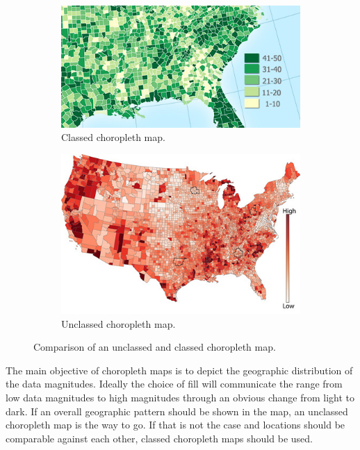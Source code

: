 \begin{figure}[!htb]
  \captionsetup[subfigure]{justification=centering}
  \centering
  \begin{subfigure}[b]{0.4\textwidth}
    \includegraphics[width=\textwidth]{images/choropleth/classed.jpg}
    \caption{Classed choropleth map.}
  \end{subfigure}
  \hfill
  \begin{subfigure}[b]{0.4\textwidth}
    \includegraphics[width=\textwidth]{images/choropleth/unclassed.jpg}
    \caption{Unclassed choropleth map.}
  \end{subfigure}
  \caption[
    Comparison of an unclassed and classed choropleth map, Urldate: 07.2016 \newline
    \small\texttt{\url{http://indiemapper.com/app/learnmore.php?l=choropleth}}
  ]{
    Comparison of an unclassed and classed choropleth map.
  }
  \label{fig:classed-unclassed-choropleth}
\end{figure}

The main objective of choropleth maps is to depict the geographic distribution of the data magnitudes. Ideally the choice of fill will communicate the range from low data magnitudes to high magnitudes through an obvious change from light to dark. If an overall geographic pattern should be shown in the map, an unclassed choropleth map is the way to go. If that is not the case and locations should be comparable against each other, classed choropleth maps should be used.


